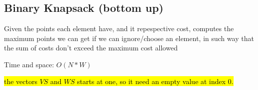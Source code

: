 \subsection{Binary Knapsack (bottom up)}

Given the points each element have, and it repespective cost, computes the maximum points we can get if we can ignore/choose an element, in such way that the sum of costs don't exceed the maximum cost allowed

Time and space: $O(N*W)$

\hl{the vectors $VS$ and $WS$ starts at one, so it need an empty value at index 0.}
